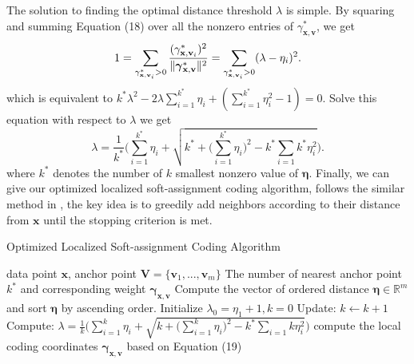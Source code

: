 \documentclass{llncs}
\DeclarePairedDelimiter\norm{\lVert}{\rVert}
\def \x {\mathbf{x}}
\def \v {\mathbf{v}}
\def \V {\mathbf{V}}
\begin{document}
	The solution to finding the optimal distance threshold $\lambda$ is simple. By squaring and summing Equation (18) over all the nonzero entries of $\gamma_{\x,\v}^*$, we get
	\begin{equation}
	1= \sum_{\gamma_{\x,\v_i}^*>0}\frac{(\gamma_{\x,\v_i}^*)^2}{\norm{\boldsymbol{\gamma}_{\x,\v}^*}^2}=\sum_{\gamma_{\x,\v_i}^*>0}(\lambda-\eta_i)^2.
	\end{equation}
	which is equivalent to $k^*\lambda^2-2\lambda\sum_{i=1}^{k^*}\eta_i+(\sum_{i=1}^{k^*}\eta_i^2-1)=0$. Solve this equation with respect to $\lambda$ we get
	\begin{equation}
	\lambda=\frac{1}{k^*}\Bigg(\sum_{i=1}^{k^*}\eta_i+\sqrt{k^*+\bigg(\sum_{i=1}^{k^*}\eta_i\bigg)^2-k^*\sum_{i=1}{k^*}\eta_i^2}\Bigg).
	\end{equation}
	where $k^*$ denotes the number of $k$ smallest nonzero value of $\boldsymbol{\eta}$. Finally, we can give our optimized localized soft-assignment coding algorithm, follows the similar method in \cite{6}, the key idea is to greedily add neighbors according to their distance from $\x$ until the stopping criterion is met.
	\begin{algorithm}[H]
		\caption{Optimized Localized Soft-assignment Coding Algorithm}
		\begin{algorithmic}
			\REQUIRE data point $\x$, anchor point $\V=\{\v_1,...,\v_m\}$
			\ENSURE The number of nearest anchor point $k^*$ and corresponding weight $\boldsymbol{\gamma}_{\x,\v}$
			\STATE Compute the vector of ordered distance $\boldsymbol{\eta} \in \mathbb{R}^m$ and sort $\boldsymbol{\eta}$ by ascending order.
			\STATE Initialize $\lambda_0=\eta_1+1,k=0$
			\STATE Update: $k\leftarrow k+1$
			\STATE Compute: $\lambda=\frac{1}{k}\Bigg(\sum_{i=1}^{k}\eta_i+\sqrt{k+\bigg(\sum_{i=1}^{k}\eta_i\bigg)^2-k^*\sum_{i=1}{k}\eta_i^2}\Bigg)$
			\ENDWHILE
			\STATE compute the local coding coordinates $\boldsymbol{\gamma}_{\x,\v}$ based on Equation (19)
		\end{algorithmic}
	\end{algorithm}
\end{document}
